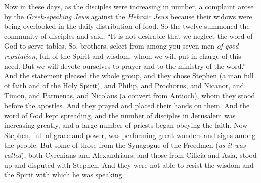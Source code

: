 \begin{biblechapter} %
 Now in these days, as the disciples were increasing in number, a complaint arose by the \textit{Greek-speaking Jews} against the \textit{Hebraic Jews} because their widows were being overlooked in the daily distribution of food.
\verse So the twelve summoned the community of disciples and said, “It is not desirable that we neglect the word of God to serve tables.
\verse So, brothers, select from among you seven men \textit{of good reputation}, full of the Spirit and wisdom, whom we will put in charge of this need.
\verse But we will devote ourselves to prayer and to the ministry of the word.”
\verse And the statement pleased the whole group, and they chose Stephen (a man full of faith and of the Holy Spirit), and Philip, and Prochorus, and Nicanor, and Timon, and Parmenas, and Nicolaus (a convert from Antioch),
\verse whom they stood before the apostles. And they prayed and placed their hands on them.
\verse And the word of God kept spreading, and the number of disciples in Jerusalem was increasing greatly, and a large number of priests began obeying the faith.
 Now Stephen, full of grace and power, was performing great wonders and signs among the people.
\verse But some of those from the Synagogue of the Freedmen (\textit{as it was called}), both Cyrenians and Alexandrians, and those from Cilicia and Asia, stood up and disputed with Stephen.
\verse And they were not able to resist the wisdom and the Spirit with which he was speaking.

\end{biblechapter}
